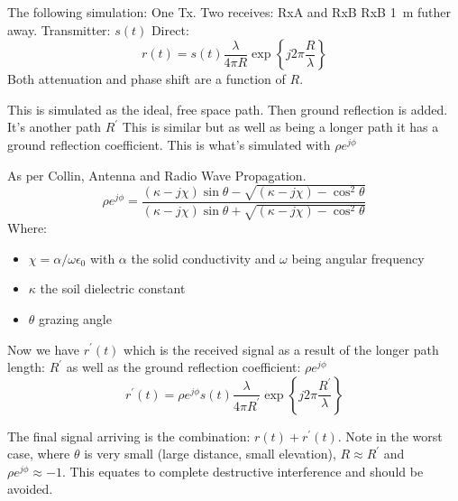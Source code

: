 The following simulation:
One Tx.
Two receives: RxA and RxB
RxB \SI{1}{\meter} futher away. 
Transmitter: \(s(t)\)
Direct:
\begin{equation}
  r(t) = s(t)\frac{\lambda}{4\pi R} \exp\left\{ j 2 \pi \frac{R}{\lambda}\right\}
\end{equation}
Both attenuation and phase shift are a function of \(R\).

This is simulated as the ideal, free space path.
Then ground reflection is added. It's another path \(R^\prime\)
This is similar but as well as being a longer path it has a ground reflection coefficient. 
This is what's simulated with \(\rho e^{j \phi}\)

As per Collin, Antenna and Radio Wave Propagation.
\begin{equation}
  \rho e^{j\phi} = \frac
    {(\kappa - j\chi)\sin\theta - \sqrt{(\kappa -j\chi) - \cos^2\theta}}
    {(\kappa - j\chi)\sin\theta + \sqrt{(\kappa -j\chi) - \cos^2\theta}}
\end{equation}
Where:
\begin{itemize}
  \item \(\chi = \alpha/\omega\epsilon_0\) with \(\alpha\) the solid conductivity and \(\omega\) being angular frequency
  \item \(\kappa\) the soil dielectric constant
  \item \(\theta\) grazing angle
\end{itemize}

Now we have \(r^\prime(t)\) which is the received signal as a result of the longer path length: \(R^\prime\) as well as the ground reflection coefficient: \(\rho e^{j\phi}\)
\begin{equation}
  r^\prime(t) = \rho e^{j\phi} s(t)\frac{\lambda}{4\pi R^\prime} \exp\left\{ j 2 \pi \frac{R^\prime}{\lambda}\right\}
\end{equation}

The final signal arriving is the combination: \(r(t) + r^\prime(t)\).
Note in the worst case, where \(\theta\) is very small (large distance, small elevation), \(R \approx R^\prime\) and \(\rho e^{j\phi} \approx -1\). This equates to complete destructive interference and should be avoided.

